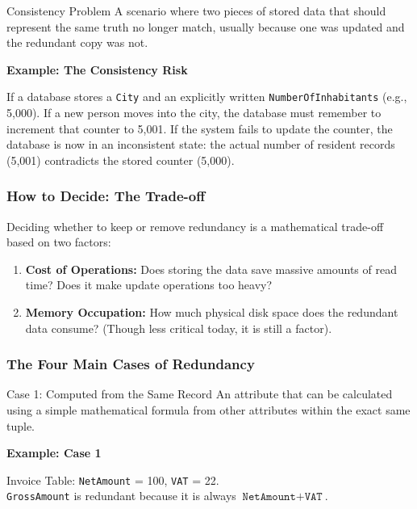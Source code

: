 \begin{defbox}{Consistency Problem}
A scenario where two pieces of stored data that should represent the same truth no longer match, usually because one was updated and the redundant copy was not.
\end{defbox}

\vspace{0.2cm}
\begin{example}{\textbf{Example: The Consistency Risk}}

If a database stores a \texttt{City} and an explicitly written \texttt{NumberOfInhabitants} (e.g., 5,000). 
If a new person moves into the city, the database must remember to increment that counter to 5,001. If the system fails to update the counter, the database is now in an inconsistent state: the actual number of resident records (5,001) contradicts the stored counter (5,000).
\end{example}

\subsubsection{How to Decide: The Trade-off}
Deciding whether to keep or remove redundancy is a mathematical trade-off based on two factors:
\begin{enumerate}
    \item \textbf{Cost of Operations:} Does storing the data save massive amounts of read time? Does it make update operations too heavy?
    \item \textbf{Memory Occupation:} How much physical disk space does the redundant data consume? (Though less critical today, it is still a factor).
\end{enumerate}

\subsubsection{The Four Main Cases of Redundancy}

\begin{defbox}{Case 1: Computed from the Same Record}
An attribute that can be calculated using a simple mathematical formula from other attributes within the exact same tuple.
\end{defbox}

\vspace{0.2cm}
\begin{example}{\textbf{Example: Case 1}}

Invoice Table: \texttt{NetAmount} = 100, \texttt{VAT} = 22. \\
\texttt{GrossAmount} is redundant because it is always $\texttt{NetAmount} + \texttt{VAT}$.
\end{example}

